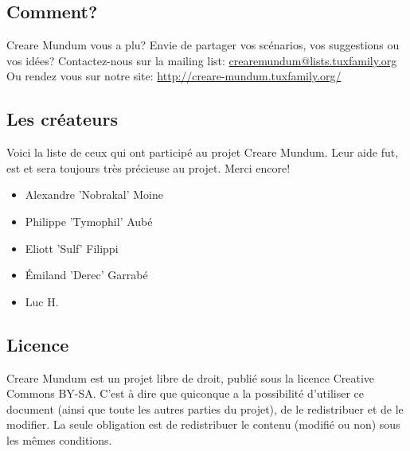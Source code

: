 \documentclass[a4paper, 11pt]{article}
\begin{document}
\subsection{Comment?}
\hypertarget{participation}{}
Creare Mundum vous a plu? 
Envie de partager vos scénarios, vos suggestions ou vos idées?
\newline
Contactez-nous sur la mailing list: \href {mailto:crearemundum@lists.tuxfamily.org}{crearemundum@lists.tuxfamily.org}
\newline
Ou rendez vous sur notre site: \href {http://creare-mundum.tuxfamily.org/} {http://creare-mundum.tuxfamily.org/}
\subsection{Les créateurs}
Voici la liste de ceux qui ont participé au projet Creare Mundum. Leur aide fut, est et sera toujours très précieuse au projet. Merci encore!  
\begin{itemize}
\item Alexandre ’Nobrakal’ Moine 
\item Philippe ’Tymophil’ Aubé 
\item Eliott ’Sulf’ Filippi
\item Émiland ’Derec’ Garrabé
\item Luc H.
\end{itemize}
\subsection{Licence}
Creare Mundum est un projet libre de droit, publié sous la licence Creative Commons BY-SA. C'est à dire que quiconque a la possibilité d'utiliser ce document (ainsi que toute les autres parties du projet), de le redistribuer et de le modifier. La seule obligation est de redistribuer le contenu (modifié ou non) sous les mêmes conditions.
\end{document}
